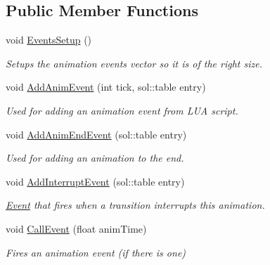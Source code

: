\subsection*{Public Member Functions}
\begin{DoxyCompactItemize}
\item 
\mbox{\label{structAnimation_ae4eef1e6d0194258f4bf2a6bbcc874f5}} 
void \hyperlink{structAnimation_ae4eef1e6d0194258f4bf2a6bbcc874f5}{Events\+Setup} ()
\begin{DoxyCompactList}\small\item\em Setups the animation event\textquotesingle{}s vector so it is of the right size. \end{DoxyCompactList}\item 
void \hyperlink{structAnimation_a0b4ff938810fc4f137b004b2a04d3c1d}{Add\+Anim\+Event} (int tick, sol\+::table entry)
\begin{DoxyCompactList}\small\item\em Used for adding an animation event from L\+UA script. \end{DoxyCompactList}\item 
void \hyperlink{structAnimation_a724a8cd4b9958010758cd76a88a7853d}{Add\+Anim\+End\+Event} (sol\+::table entry)
\begin{DoxyCompactList}\small\item\em Used for adding an animation to the end. \end{DoxyCompactList}\item 
void \hyperlink{structAnimation_a8178c273c3890085c4a39da1fb1531fb}{Add\+Interrupt\+Event} (sol\+::table entry)
\begin{DoxyCompactList}\small\item\em \hyperlink{classEvent}{Event} that fires when a transition interrupts this animation. \end{DoxyCompactList}\item 
void \hyperlink{structAnimation_a4bfa0e66492903e4435233193ad4979a}{Call\+Event} (float anim\+Time)
\begin{DoxyCompactList}\small\item\em Fires an animation event (if there is one) \end{DoxyCompactList}\end{DoxyCompactItemize}
